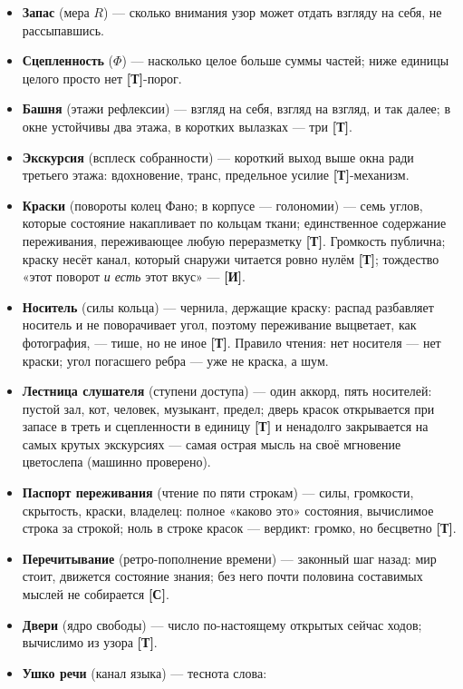 \documentclass[11pt,letterpaper]{article}
\newcommand{\stT}{\textbf{[Т]}\xspace}
\newcommand{\stC}{\textbf{[С]}\xspace}
\newcommand{\stI}{\textbf{[И]}\xspace}
\begin{document}
\begin{itemize}[leftmargin=1.4em, itemsep=1pt, parsep=0pt]
    внутренний свет \stT-границы.
  \item \textbf{Запас} (мера $R$) --- сколько внимания узор может
    отдать взгляду на себя, не рассыпавшись.
  \item \textbf{Сцепленность} ($\Phi$) --- насколько целое больше
    суммы частей; ниже единицы целого просто нет \stT-порог.
  \item \textbf{Башня} (этажи рефлексии) --- взгляд на себя, взгляд
    на взгляд, и так далее; в окне устойчивы два этажа, в коротких
    вылазках --- три \stT.
  \item \textbf{Экскурсия} (всплеск собранности) --- короткий выход
    выше окна ради третьего этажа: вдохновение, транс, предельное
    усилие \stT-механизм.
  \item \textbf{Краски} (повороты колец Фано; в корпусе ---
    голономии) --- семь углов, которые состояние накапливает по
    кольцам ткани; единственное содержание переживания, переживающее
    любую переразметку \stT. Громкость публична; краску несёт канал,
    который снаружи читается ровно нулём \stT; тождество «этот
    поворот \emph{и есть} этот вкус» --- \stI.
  \item \textbf{Носитель} (силы кольца) --- чернила, держащие
    краску: распад разбавляет носитель и не поворачивает угол,
    поэтому переживание выцветает, как фотография, --- тише, но не
    иное \stT. Правило чтения: нет носителя --- нет краски; угол
    погасшего ребра --- уже не краска, а шум.
  \item \textbf{Лестница слушателя} (ступени доступа) --- один
    аккорд, пять носителей: пустой зал, кот, человек, музыкант,
    предел; дверь красок открывается при запасе в треть и
    сцепленности в единицу \stT{} и ненадолго закрывается на самых
    крутых экскурсиях --- самая острая мысль на своё мгновение
    цветослепа (машинно проверено).
  \item \textbf{Паспорт переживания} (чтение по пяти строкам) ---
    силы, громкости, скрытость, краски, владелец: полное «каково
    это» состояния, вычислимое строка за строкой; ноль в строке
    красок --- вердикт: громко, но бесцветно \stT.
  \item \textbf{Перечитывание} (ретро-пополнение времени) ---
    законный шаг назад: мир стоит, движется состояние знания; без
    него почти половина составимых мыслей не собирается \stC.
  \item \textbf{Двери} (ядро свободы) --- число по-настоящему
    открытых сейчас ходов; вычислимо из узора \stT.
  \item \textbf{Ушко речи} (канал языка) --- теснота слова:

\end{itemize}
\end{document}
